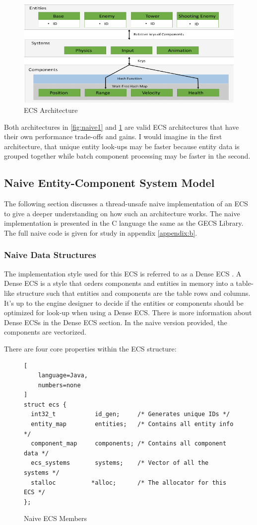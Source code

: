 \begin{figure}[htbp]
    \centering
    \includegraphics[width=0.7\linewidth]{resources/ecs2.png}
    \caption{ECS Architecture}
    \label{fig:advanced2}
\end{figure}

Both architectures in \ref{fig:naive1} and \ref{fig:advanced2} are valid ECS architectures that have their own performance trade-offs and gains. I would imagine in the first architecture, that unique entity look-ups may be faster because entity data is grouped together while batch component processing may be faster in the second. 

\subsection{Naive Entity-Component System Model}
\label{sec:ecs_naive}
The following section discusses a thread-unsafe naive implementation of an ECS to give a deeper understanding on how such an architecture works. The naive implementation is presented in the C language the same as the GECS Library. The full naive code is given for study in appendix \ref{appendix:b}.

\subsubsection{Naive Data Structures}
The implementation style used for this ECS is referred to as a Dense ECS \cite{EnTT_SparseSets}. A Dense ECS is a style that orders components and entities in memory into a table-like structure such that entities and components are the table rows and columns. It's up to the engine designer to decide if the entities or components should be optimized for look-up when using a Dense ECS. There is more information about Dense ECSs in the Dense ECS section. In the naive version provided, the components are vectorized.

There are four core properties within the ECS structure:

\begin{figure}[H]
\begin{lstlisting}[
    language=Java,
    numbers=none
]
struct ecs {
  int32_t           id_gen;     /* Generates unique IDs */
  entity_map        entities;   /* Contains all entity info */
  component_map     components; /* Contains all component data */
  ecs_systems       systems;    /* Vector of all the systems */
  stalloc          *alloc;      /* The allocator for this ECS */
};
\end{lstlisting}
    \caption{Naive ECS Members}
    \label{code:naive_ecs_data}
\end{figure}

